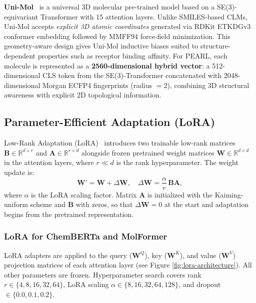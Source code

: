 \documentclass[pdflatex,sn-mathphys-num,Numbered]{sn-jnl}%
\begin{document}
\textbf{Uni-Mol}~\cite{zhou2023unimol} is a universal 3D molecular pre-trained model based on a SE(3)-equivariant Transformer with 15 attention layers. Unlike SMILES-based CLMs, Uni-Mol accepts \emph{explicit 3D atomic coordinates} generated via RDKit ETKDGv3 conformer embedding followed by MMFF94 force-field minimization. This geometry-aware design gives Uni-Mol inductive biases suited to structure-dependent properties such as receptor binding affinity. For PEARL, each molecule is represented as a \textbf{2560-dimensional hybrid vector}: a 512-dimensional CLS token from the SE(3)-Transformer concatenated with 2048-dimensional Morgan ECFP4 fingerprints (radius $= 2$), combining 3D structural awareness with explicit 2D topological information.

\subsection{Parameter-Efficient Adaptation (LoRA)}\label{sec:lora}
Low-Rank Adaptation (LoRA)~\cite{hu2021lora} introduces two trainable low-rank matrices $\mathbf{B} \in \mathbb{R}^{d \times r}$ and $\mathbf{A} \in \mathbb{R}^{r \times d}$ alongside frozen pretrained weight matrices $\mathbf{W} \in \mathbb{R}^{d \times d}$ in the attention layers, where $r \ll d$ is the rank hyperparameter. The weight update is:
\begin{equation}
  \mathbf{W}' = \mathbf{W} + \Delta\mathbf{W}, \quad \Delta\mathbf{W} = \frac{\alpha}{r}\,\mathbf{B}\mathbf{A},
\end{equation}
where $\alpha$ is the LoRA scaling factor. Matrix $\mathbf{A}$ is initialized with the Kaiming-uniform \cite{he2015delving} scheme and $\mathbf{B}$ with zeros, so that $\Delta\mathbf{W}=0$ at the start and adaptation begins from the pretrained representation.

\subsubsection{LoRA for ChemBERTa and MolFormer}
LoRA adapters are applied to the query ($\mathbf{W}^Q$), key ($\mathbf{W}^K$), and value ($\mathbf{W}^V$) projection matrices of each attention layer (see Figure \ref{fig:lora-architecture}). All other parameters are frozen. Hyperparameter search covers rank $r \in \{4, 8, 16, 32, 64\}$, LoRA scaling $\alpha \in \{8, 16, 32, 64, 128\}$, and dropout $\in \{0.0, 0.1, 0.2\}$.
\end{document}
